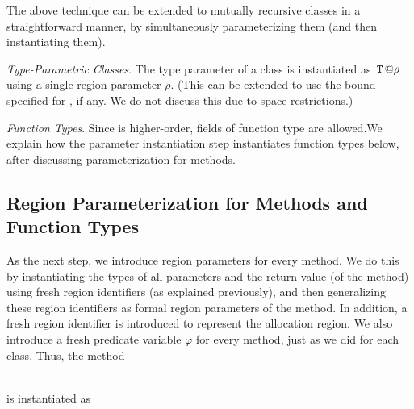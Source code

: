 The above technique can be extended to mutually recursive classes in a
straightforward manner, by simultaneously parameterizing them (and
then instantiating them).

\emph{Type-Parametric Classes}.
The type parameter  of a class  is instantiated as $\,{\tt T}\,@\rho$ using a single region parameter $\rho$. 
(This can be extended to use the bound specified for , if any. We do not
discuss this due to space restrictions.)

\emph{Function Types}.
Since \FB{} is higher-order, fields of function type are allowed.We explain how the parameter instantiation step
instantiates function types below, after discussing parameterization for methods.




\subsection{Region Parameterization for Methods and Function Types}

As the next step, we introduce region parameters for every method.
We do this by instantiating the types of all parameters and the
return value (of the method) using fresh region identifiers (as explained previously),
and then generalizing these region identifiers as formal region parameters
of the method. In addition, a fresh region identifier is introduced to represent the
allocation region.
We also introduce a fresh predicate variable $\varphi$ for every method,
just as we did for each class.
Thus, the method

 \\
is instantiated as

